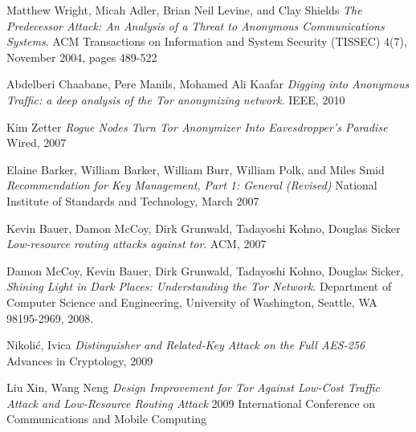 \documentclass[journal]{IEEEtran}
\begin{document}
\begin{thebibliography}{9}

  Matthew Wright, Micah Adler, Brian Neil Levine, and Clay Shields
  \emph{The Predecessor Attack: An Analysis of a Threat to Anonymous Communications Systems}.
  ACM Transactions on Information and System Security (TISSEC) 4(7), November 2004, pages 489-522

  Abdelberi Chaabane, Pere Manils, Mohamed Ali Kaafar
  \emph{Digging into Anonymous Trafﬁc: a deep analysis of the Tor anonymizing network}.
  IEEE, 2010

  Kim Zetter
  \emph{Rogue Nodes Turn Tor Anonymizer Into Eavesdropper's Paradise}
  Wired, 2007

  Elaine Barker, William Barker, William Burr, William Polk, and Miles Smid
  \emph{Recommendation for Key Management, Part 1: General (Revised)}
  National Institute of Standards and Technology, March 2007

  Kevin Bauer, Damon McCoy, Dirk Grunwald, Tadayoshi Kohno, Douglas Sicker
  \emph{Low-resource routing attacks against tor}.
  ACM, 2007

  Damon McCoy, Kevin Bauer, Dirk Grunwald, Tadayoshi Kohno, Douglas Sicker,
  \emph{Shining Light in Dark Places: Understanding the Tor Network}.
  Department of Computer Science and Engineering,
  University of Washington, Seattle, WA 98195-2969,
  2008.

  Nikolić, Ivica
  \emph{Distinguisher and Related-Key Attack on the Full AES-256}
  Advances in Cryptology, 2009

  Liu Xin, Wang Neng
  \emph{Design Improvement for Tor Against Low-Cost Traffic Attack and Low-Resource Routing Attack}
  2009 International Conference on Communications and Mobile Computing


\end{thebibliography}
\end{document}
